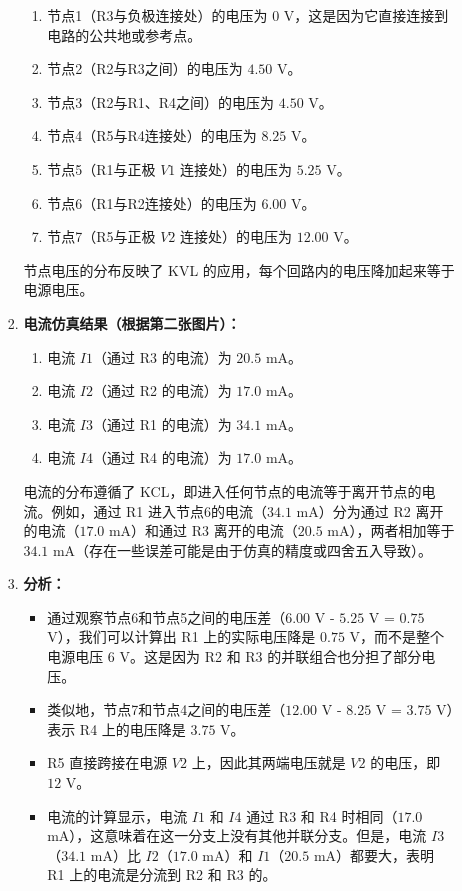 \documentclass[dvipsnames, svgnames,a4paper,11pt]{article}
\begin{document}
\begin{enumerate}
\begin{enumerate}
\begin{enumerate}
				\begin{enumerate}
					\item 节点1（R3与负极连接处）的电压为 $0$ V，这是因为它直接连接到电路的公共地或参考点。
					\item 节点2（R2与R3之间）的电压为 $4.50$ V。
					\item 节点3（R2与R1、R4之间）的电压为 $4.50$ V。
					\item 节点4（R5与R4连接处）的电压为 $8.25$ V。
					\item 节点5（R1与正极 $V1$ 连接处）的电压为 $5.25$ V。
					\item 节点6（R1与R2连接处）的电压为 $6.00$ V。
					\item 节点7（R5与正极 $V2$ 连接处）的电压为 $12.00$ V。
				\end{enumerate}
				
				节点电压的分布反映了 KVL 的应用，每个回路内的电压降加起来等于电源电压。
				
				\item \textbf{电流仿真结果（根据第二张图片）：}
				
				\begin{enumerate}
					\item 电流 $I1$（通过 R3 的电流）为 $20.5$ mA。
					\item 电流 $I2$（通过 R2 的电流）为 $17.0$ mA。
					\item 电流 $I3$（通过 R1 的电流）为 $34.1$ mA。
					\item 电流 $I4$（通过 R4 的电流）为 $17.0$ mA。
				\end{enumerate}
				
				电流的分布遵循了 KCL，即进入任何节点的电流等于离开节点的电流。例如，通过 R1 进入节点6的电流（$34.1$ mA）分为通过 R2 离开的电流（$17.0$ mA）和通过 R3 离开的电流（$20.5$ mA），两者相加等于 $34.1$ mA（存在一些误差可能是由于仿真的精度或四舍五入导致）。
				
				\item \textbf{分析：}
				\begin{itemize}
					\item 通过观察节点6和节点5之间的电压差（$6.00$ V - $5.25$ V = $0.75$ V），我们可以计算出 R1 上的实际电压降是 $0.75$ V，而不是整个电源电压 $6$ V。这是因为 R2 和 R3 的并联组合也分担了部分电压。
					\item 类似地，节点7和节点4之间的电压差（$12.00$ V - $8.25$ V = $3.75$ V）表示 R4 上的电压降是 $3.75$ V。
					\item R5 直接跨接在电源 $V2$ 上，因此其两端电压就是 $V2$ 的电压，即 $12$ V。
					\item 电流的计算显示，电流 $I1$ 和 $I4$ 通过 R3 和 R4 时相同（$17.0$ mA），这意味着在这一分支上没有其他并联分支。但是，电流 $I3$（$34.1$ mA）比 $I2$（$17.0$ mA）和 $I1$（$20.5$ mA）都要大，表明 R1 上的电流是分流到 R2 和 R3 的。
				\end{itemize}
				

\end{enumerate}
\end{enumerate}
\end{enumerate}
\end{document}
